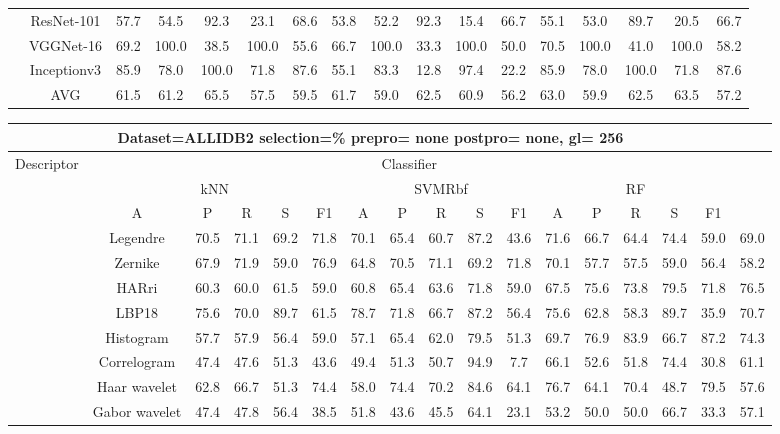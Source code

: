 \documentclass[12pt,italian]{article}
\begin{document}
\begin{tiny}
\begin{longtable}{lcccccccccccccccc}
& ResNet-101 & 57.7 & 54.5 & 92.3 & 23.1 & 68.6 & 53.8 & 52.2 & 92.3 & 15.4 & 66.7 & 55.1 & 53.0 & 89.7 & 20.5 & 66.7 \\ 
& VGGNet-16 & 69.2 & 100.0 & 38.5 & 100.0 & 55.6 & 66.7 & 100.0 & 33.3 & 100.0 & 50.0 & 70.5 & 100.0 & 41.0 & 100.0 & 58.2 \\ 
& Inceptionv3 & 85.9 & 78.0 & 100.0 & 71.8 & 87.6 & 55.1 & 83.3 & 12.8 & 97.4 & 22.2 & 85.9 & 78.0 & 100.0 & 71.8 & 87.6 \\ 
\hline
& AVG & 61.5 & 61.2 & 65.5 & 57.5 & 59.5 & 61.7 & 59.0 & 62.5 & 60.9 & 56.2 & 63.0 & 59.9 & 62.5 & 63.5 & 57.2 \\ 
\hline
\bottomrule
\end{longtable} 

 \pagebreak 
\begin{longtable}{lcccccccccccccccc}
\toprule
\multicolumn{16}{c}{Dataset=ALLIDB2 selection=\% prepro= none postpro= none, gl= 256} \\ 
\toprule
Descriptor & \multicolumn{15}{c}{Classifier} \\ 
& \multicolumn{5}{c}{kNN} & \multicolumn{5}{c}{SVMRbf} & \multicolumn{5}{c}{RF} \\ 
& A & P & R & S & F1 & A & P & R & S & F1 & A & P & R & S & F1 \\ 
\midrule
& Legendre & 70.5 & 71.1 & 69.2 & 71.8 & 70.1 & 65.4 & 60.7 & 87.2 & 43.6 & 71.6 & 66.7 & 64.4 & 74.4 & 59.0 & 69.0 \\ 
& Zernike & 67.9 & 71.9 & 59.0 & 76.9 & 64.8 & 70.5 & 71.1 & 69.2 & 71.8 & 70.1 & 57.7 & 57.5 & 59.0 & 56.4 & 58.2 \\ 
& HARri & 60.3 & 60.0 & 61.5 & 59.0 & 60.8 & 65.4 & 63.6 & 71.8 & 59.0 & 67.5 & 75.6 & 73.8 & 79.5 & 71.8 & 76.5 \\ 
& LBP18 & 75.6 & 70.0 & 89.7 & 61.5 & 78.7 & 71.8 & 66.7 & 87.2 & 56.4 & 75.6 & 62.8 & 58.3 & 89.7 & 35.9 & 70.7 \\ 
& Histogram & 57.7 & 57.9 & 56.4 & 59.0 & 57.1 & 65.4 & 62.0 & 79.5 & 51.3 & 69.7 & 76.9 & 83.9 & 66.7 & 87.2 & 74.3 \\ 
& Correlogram & 47.4 & 47.6 & 51.3 & 43.6 & 49.4 & 51.3 & 50.7 & 94.9 &  7.7 & 66.1 & 52.6 & 51.8 & 74.4 & 30.8 & 61.1 \\ 
& Haar wavelet & 62.8 & 66.7 & 51.3 & 74.4 & 58.0 & 74.4 & 70.2 & 84.6 & 64.1 & 76.7 & 64.1 & 70.4 & 48.7 & 79.5 & 57.6 \\ 
& Gabor wavelet & 47.4 & 47.8 & 56.4 & 38.5 & 51.8 & 43.6 & 45.5 & 64.1 & 23.1 & 53.2 & 50.0 & 50.0 & 66.7 & 33.3 & 57.1 \\ 

\end{longtable}
\end{tiny}
\end{document}
